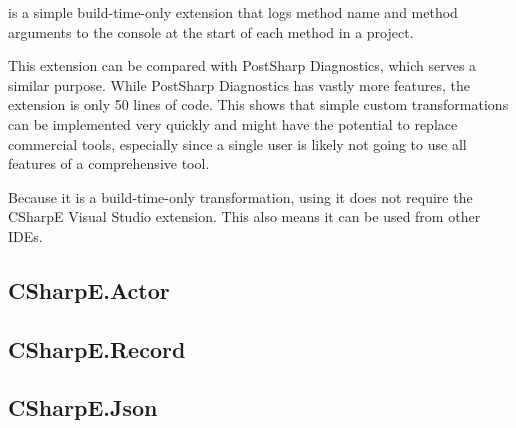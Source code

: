  is a simple build-time-only extension that logs method name and method arguments to the console at the start of each method in a project.

This extension can be compared with PostSharp Diagnostics, \cite{postsharp-diag} which serves a similar purpose. While PostSharp Diagnostics has vastly more features, the extension is only 50 lines of code. This shows that simple custom transformations can be implemented very quickly and might have the potential to replace commercial tools, especially since a single user is likely not going to use all features of a comprehensive tool.

Because it is a build-time-only transformation, using it does not require the CSharpE Visual Studio extension. This also means it can be used from other \acp{IDE}.

\subsection{CSharpE.Actor}


\subsection{CSharpE.Record}

\subsection{CSharpE.Json}
